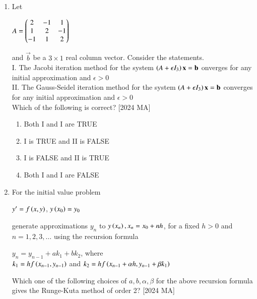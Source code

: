 \documentclass[journal]{IEEEtran}
\begin{document}
\begin{enumerate}
\begin{enumerate}
\end{enumerate}
\item Let 
\begin{center}
    $A = \begin{pmatrix}2 & -1 & 1 \\ 1 & 2 & -1 \\
    -1 & 1 & 2\end{pmatrix}$
\end{center}
and $\vec{b}$ be a $3 \times 1$ real column vector. Consider the statements. \\
I. The Jacobi iteration method for the system $\left(A + \epsilon I_3\right) \mathbf{x} = \mathbf{b}$ onverges for any
initial approximation and $\epsilon > 0$ \\
II. The Gauss-Seidel iteration method for the system $\left(A + \epsilon I_3\right) \mathbf{x} = \mathbf{b}$ converges for any initial approximation and $\epsilon > 0$ \\
Which of the following is correct? \hfill [2024 MA]
\begin{enumerate}
    \item Both I and I are TRUE
    \item I is TRUE and II is FALSE
    \item I is FALSE and II is TRUE
    \item Both I and I are FALSE
\end{enumerate}
\item For the initial value problem 
\begin{center}
    $y^\prime = f \left(x,y\right)$,  $y \left(x_0\right) = y_0$
\end{center}
generate approximations $y_n$ to $y\left(x_n\right), x_n = x_0 + nh$, for a fixed $h > 0$ and $n = 1,2,3, \dots$ using the recursion formula 
\begin{center}
    $y_n = y_{n-1} + ak_1 + bk_2$, where \\
    $k_1 = hf\left(x_{n-1}, y_{n-1}\right)$ and $k_2 = hf\left(x_{n-1} + \alpha h, y_{n-1} + \beta k_1\right)$
\end{center}
Which one of the following choices of $a,b, \alpha, \beta$ for the above recursion formula gives the Runge-Kuta method of order 2? \hfill [2024 MA]
\begin{enumerate}

\end{enumerate}
\end{enumerate}
\end{document}
